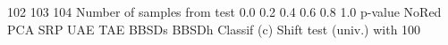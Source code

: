 \documentclass[12pt]{report}
\begin{document}
102 103 104 Number of samples from test 0.0 0.2 0.4 0.6 0.8 1.0 p-value NoRed PCA SRP UAE TAE BBSDs BBSDh Classif (c) Shift test (univ.) with 100%
\end{document}
